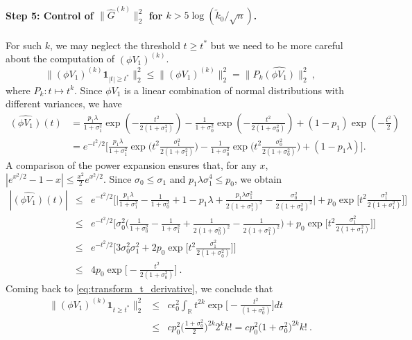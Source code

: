 \documentclass[twoside,11pt]{article}
\def\beq{\begin{equation}}
\def\eeq{\end{equation}}
\def\beqn{\begin{eqnarray*}}
\def\eeqn{\end{eqnarray*}}
\newcommand{\<}{\langle}
\renewcommand{\>}{\rangle}
\begin{document}
\paragraph{Step 5: Control of $\|\widehat{G}^{(k)}\|_2^2$ for $k> 5\log(\tilde{k}_0/\sqrt{n})$.}
For such $k$, we may neglect the threshold $t\geq t^*$ but we need to be more careful about the computation of $(\phi  V_1)^{(k)}$. 
\beq\label{eq:transform_t_derivative}
\|(\phi  V_1)^{(k)}\mathbf{1}_{|t|\geq t^*}\|_2^2\leq \|(\phi  V_1)^{(k)}\|_2^2 =\|P_k \widehat{(\phi  V_1)}\|_2^2\  ,
\eeq
where $P_k: t\mapsto t^k$. 
Since $\phi  V_1$ is a linear combination of normal distributions with different variances, we have 
\begin{align*}
\widehat{(\phi  V_1)}(t) &=  \frac{p_1 \lambda}{1+\sigma_1^2} \exp(-\frac{t^2}{2(1+\sigma_1^2)})- \frac{1}{1+\sigma_0^2}\exp(-\frac{t^2}{2(1+\sigma_0^2)}) +(1-p_1)\exp(-\frac{t^2}{2})\\
&= e^{-t^2/2} \Big[\frac{p_1 \lambda}{1+\sigma_1^2} \exp\big(t^2\frac{\sigma_1^2}{2(1+\sigma_1^2)}\big)
- \frac{1}{1+\sigma_0^2}\exp\big(t^2\frac{\sigma_0^2}{2(1+\sigma_0^2)}\big) +(1-p_1\lambda)\Big].
\end{align*}
A comparison of the power expansion ensures that, for any $x$, $|e^{x^2/2}-1-x|\leq \tfrac{x^2}{2}e^{x^2/2}$. Since $\sigma_0\leq \sigma_1$ and $p_1\lambda\sigma_1^4\leq p_0$, we obtain
\beqn 
|\widehat{(\phi  V_1)}(t)|&\leq& e^{-t^2/2}\Big[\Big|\frac{p_1\lambda}{1+\sigma_1^2} -\frac{1}{1+\sigma_0^2} +1-p_1\lambda + \frac{p_1\lambda\sigma_1^2}{2(1+\sigma_1^2)^2} -\frac{\sigma_0^2}{2(1+\sigma_0^2)^2}\Big|  + p_0\exp\Big[t^2\frac{\sigma_1^2}{2(1+\sigma_1^2)}\Big]\Big]\\
&\leq& e^{-t^2/2}\Big[\sigma_0^2\Big( \frac{1}{1+\sigma_0^2}-\frac{1}{1+\sigma_1^2} +  \frac{1}{2(1+\sigma_0^2)^2} -\frac{1}{2(1+\sigma_1^2)^2}\Big)  + p_0\exp\Big[t^2\frac{\sigma_1^2}{2(1+\sigma_1^2)}\Big]\Big]\\
&\leq & e^{-t^2/2}\Big[3\sigma^2_0\sigma_1^2  + 2p_0\exp\Big[t^2\frac{\sigma_1^2}{2(1+\sigma_0^2)}\Big]\Big]\\
&\leq & 4p_0\exp\Big[-\frac{t^2}{2(1+\sigma_0^2)}\Big]\ .
\eeqn 
Coming back to \eqref{eq:transform_t_derivative}, we conclude that 
\begin{eqnarray} \nonumber
\|(\phi  V_1)^{(k)}\mathbf{1}_{t\geq t^*}\|_2^2 &\leq& c \epsilon^2_0 \int_{\mathbb{R}} t^{2k}\exp\big[-\frac{t^2}{(1+\sigma_0^2)}\big]dt\\
 &\leq & c p_0^2 \big(\frac{1+\sigma_0^2}{2}\big)^{2k} 2^k k! = cp_0^2 \big(1+\sigma_0^2\big)^{2k} k!\ .\label{eq:phi_V1_k_upper}
\end{eqnarray}
\end{document}
